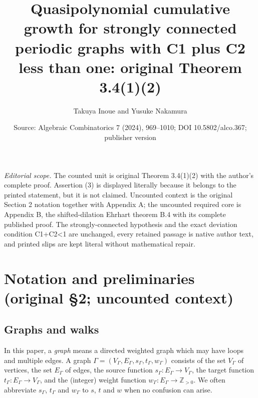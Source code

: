 \documentclass[10pt,a4paper]{amsart}
\title[Quasipolynomial cumulative growth for periodic graphs]{Quasipolynomial cumulative growth for strongly connected periodic graphs with C1 plus C2 less than one: original Theorem 3.4(1)(2)}
\author{Takuya Inoue and Yusuke Nakamura}
\date{Source: Algebraic Combinatorics 7 (2024), 969--1010; DOI 10.5802/alco.367; publisher version}
\theoremstyle{plain}
\theoremstyle{definition}
\theoremstyle{remark}
\begin{document}
\maketitle
\noindent\textit{Editorial scope.} The counted unit is original Theorem 3.4(1)(2) with the author's complete proof. Assertion (3) is displayed literally because it belongs to the printed statement, but it is not claimed. Uncounted context is the original Section 2 notation together with Appendix A; the uncounted required core is Appendix B, the shifted-dilation Ehrhart theorem B.4 with its complete published proof. The strongly-connected hypothesis and the exact deviation condition C1+C2<1 are unchanged, every retained passage is native author text, and printed slips are kept literal without mathematical repair.
\setcounter{section}{1}
\section{Notation and preliminaries (original \S2; uncounted context)}
\setcounter{subsection}{1}
\subsection{Graphs and walks}\label{subsection:GandW}

In this paper, a \textit{graph} means a directed weighted graph which may have loops and multiple edges. 
A graph $\Gamma = (V_{\Gamma}, E_{\Gamma}, s_{\Gamma}, t_{\Gamma}, w_{\Gamma})$ 
consists of the set $V_{\Gamma}$ of vertices, the set $E_{\Gamma}$ of edges, 
the source function $s_{\Gamma}: E_{\Gamma} \to V_{\Gamma}$, 
the target function $t_{\Gamma}: E_{\Gamma} \to V_{\Gamma}$, and 
the (integer) weight function $w_{\Gamma}: E_{\Gamma} \to \mathbb{Z}_{> 0}$. 
We often abbreviate $s_{\Gamma}$, $t_{\Gamma}$ and $w_{\Gamma}$ to $s$, $t$ and $w$ 
when no confusion can arise. 
\end{document}
